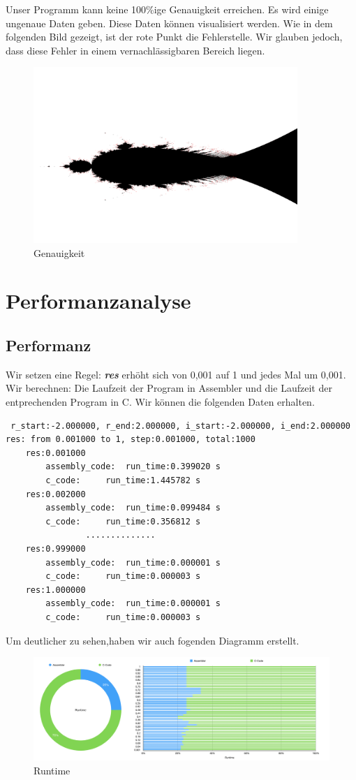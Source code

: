 \documentclass[course=erap]{aspdoc}
\begin{document}
Unser Programm kann keine 100\%ige Genauigkeit erreichen. Es wird einige ungenaue Daten geben. Diese Daten können visualisiert werden. Wie in dem folgenden Bild gezeigt, ist der rote Punkt die Fehlerstelle. Wir glauben jedoch, dass diese Fehler in einem vernachlässigbaren Bereich liegen.
\begin{figure}[htb]
\centering
\includegraphics[width=10cm]{pic/Genauigkeit.png}
\caption{Genauigkeit}
\label{fig:label}
\end{figure}


\section{Performanzanalyse}\label{performance}
\subsection{Performanz}
Wir setzen eine Regel: \emph{\textbf{res}} erhöht sich von 0,001 auf 1 und jedes Mal um 0,001. Wir berechnen: Die Laufzeit der Program in Assembler und die Laufzeit der entprechenden Program in C. Wir können die folgenden Daten erhalten.
 \begin{lstlisting}
 r_start:-2.000000, r_end:2.000000, i_start:-2.000000, i_end:2.000000
res: from 0.001000 to 1, step:0.001000, total:1000
	res:0.001000
		assembly_code: 	run_time:0.399020 s
		c_code: 	run_time:1.445782 s
	res:0.002000
		assembly_code: 	run_time:0.099484 s
		c_code: 	run_time:0.356812 s
                ..............
    res:0.999000
		assembly_code: 	run_time:0.000001 s
		c_code: 	run_time:0.000003 s
	res:1.000000
		assembly_code: 	run_time:0.000001 s
		c_code: 	run_time:0.000003 s
\end{lstlisting}
Um deutlicher zu sehen,haben wir auch fogenden Diagramm erstellt.
\begin{figure}[htb]
\centering
\includegraphics[width=12cm]{pic/Runtime.png}
\caption{Runtime}
\label{fig:label}
\end{figure}
\end{document}
